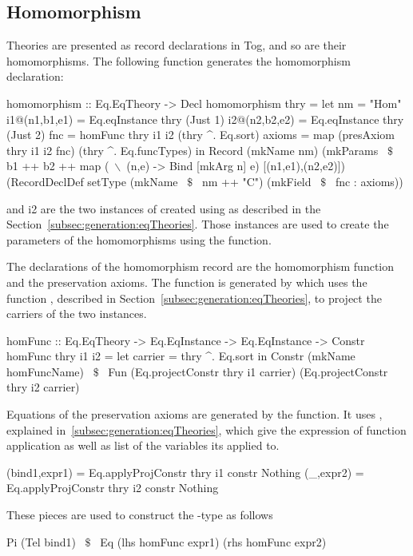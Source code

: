 \subsection{Homomorphism}
Theories are presented as record declarations in Tog, and so are their homomorphisms. The following function generates the homomorphism declaration: 
\begin{hscode} 
homomorphism :: Eq.EqTheory -> Decl
homomorphism thry =
  let nm = "Hom" 
      i1@(n1,b1,e1) = Eq.eqInstance thry (Just 1) 
      i2@(n2,b2,e2) = Eq.eqInstance thry (Just 2)
      fnc = homFunc thry i1 i2 (thry ^. Eq.sort)
      axioms = map (presAxiom thry i1 i2 fnc) (thry ^. Eq.funcTypes)  
  in Record (mkName nm)
   (mkParams ~$\$$~ b1 ++ b2 ++ 
               map (~$\backslash$~(n,e) -> Bind [mkArg n] e) [(n1,e1),(n2,e2)])
   (RecordDeclDef setType (mkName ~$\$$~ nm ++ "C") 
                  (mkField ~$\$$~ fnc : axioms))
\end{hscode} 
\noindent {} and {i2} are the two instances of  created using  as described in the Section~\ref{subsec:generation:eqTheories}. 
Those instances are used to create the parameters of the homomorphisms using the  function. 

The declarations of the homomorphism record are the homomorphism function and the preservation axioms. The function is generated by  which uses the function , described in Section~\ref{subsec:generation:eqTheories}, to project the carriers of the two instances. 
\begin{hscode} 
homFunc :: Eq.EqTheory -> Eq.EqInstance -> Eq.EqInstance -> Constr 
homFunc thry i1 i2 =
  let carrier = thry ^. Eq.sort
  in Constr (mkName homFuncName) ~$\$$~
       Fun (Eq.projectConstr thry i1 carrier) 
           (Eq.projectConstr thry i2 carrier) 
\end{hscode}

Equations of the preservation axioms are generated by the  function. It uses , explained in~\ref{subsec:generation:eqTheories}, which give the expression of function application as well as list of the variables its applied to. 
\begin{hscode} 
(bind1,expr1) = Eq.applyProjConstr thry i1 constr Nothing
    (_,expr2) = Eq.applyProjConstr thry i2 constr Nothing 
\end{hscode} 
\noindent These pieces are used to construct the -type as follows 
\begin{hscode}
Pi (Tel bind1) ~$\$$~ Eq (lhs homFunc expr1) (rhs homFunc expr2)
\end{hscode} 


